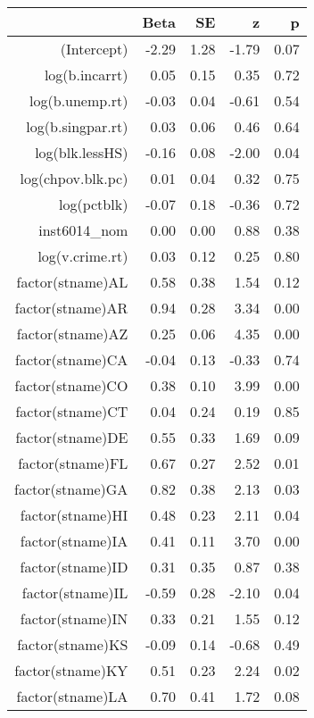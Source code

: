 \begin{table}[ht]
\centering
\begin{tabular}{rrrrr}
  \hline
 & Beta & SE & z & p \\ 
  \hline
(Intercept) & -2.29 & 1.28 & -1.79 & 0.07 \\ 
  log(b.incarrt) & 0.05 & 0.15 & 0.35 & 0.72 \\ 
  log(b.unemp.rt) & -0.03 & 0.04 & -0.61 & 0.54 \\ 
  log(b.singpar.rt) & 0.03 & 0.06 & 0.46 & 0.64 \\ 
  log(blk.lessHS) & -0.16 & 0.08 & -2.00 & 0.04 \\ 
  log(chpov.blk.pc) & 0.01 & 0.04 & 0.32 & 0.75 \\ 
  log(pctblk) & -0.07 & 0.18 & -0.36 & 0.72 \\ 
  inst6014\_nom & 0.00 & 0.00 & 0.88 & 0.38 \\ 
  log(v.crime.rt) & 0.03 & 0.12 & 0.25 & 0.80 \\ 
  factor(stname)AL & 0.58 & 0.38 & 1.54 & 0.12 \\ 
  factor(stname)AR & 0.94 & 0.28 & 3.34 & 0.00 \\ 
  factor(stname)AZ & 0.25 & 0.06 & 4.35 & 0.00 \\ 
  factor(stname)CA & -0.04 & 0.13 & -0.33 & 0.74 \\ 
  factor(stname)CO & 0.38 & 0.10 & 3.99 & 0.00 \\ 
  factor(stname)CT & 0.04 & 0.24 & 0.19 & 0.85 \\ 
  factor(stname)DE & 0.55 & 0.33 & 1.69 & 0.09 \\ 
  factor(stname)FL & 0.67 & 0.27 & 2.52 & 0.01 \\ 
  factor(stname)GA & 0.82 & 0.38 & 2.13 & 0.03 \\ 
  factor(stname)HI & 0.48 & 0.23 & 2.11 & 0.04 \\ 
  factor(stname)IA & 0.41 & 0.11 & 3.70 & 0.00 \\ 
  factor(stname)ID & 0.31 & 0.35 & 0.87 & 0.38 \\ 
  factor(stname)IL & -0.59 & 0.28 & -2.10 & 0.04 \\ 
  factor(stname)IN & 0.33 & 0.21 & 1.55 & 0.12 \\ 
  factor(stname)KS & -0.09 & 0.14 & -0.68 & 0.49 \\ 
  factor(stname)KY & 0.51 & 0.23 & 2.24 & 0.02 \\ 
  factor(stname)LA & 0.70 & 0.41 & 1.72 & 0.08 \\ 

\end{tabular}
\end{table}
